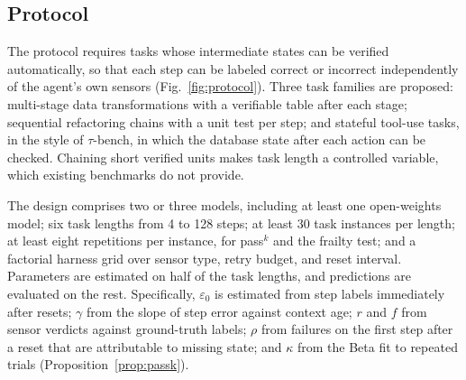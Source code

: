 \documentclass[journal]{IEEEtran}
\begin{document}
\subsection{Protocol}
The protocol requires tasks whose intermediate states can be verified automatically, so that each step can be labeled correct or incorrect independently of the agent's own sensors (Fig.~\ref{fig:protocol}). Three task families are proposed: multi-stage data transformations with a verifiable table after each stage; sequential refactoring chains with a unit test per step; and stateful tool-use tasks, in the style of $\tau$-bench, in which the database state after each action can be checked. Chaining short verified units makes task length a controlled variable, which existing benchmarks do not provide.

The design comprises two or three models, including at least one open-weights model; six task lengths from 4 to 128 steps; at least 30 task instances per length; at least eight repetitions per instance, for pass$^k$ and the frailty test; and a factorial harness grid over sensor type, retry budget, and reset interval. Parameters are estimated on half of the task lengths, and predictions are evaluated on the rest. Specifically, $\varepsilon_0$ is estimated from step labels immediately after resets; $\gamma$ from the slope of step error against context age; $r$ and $f$ from sensor verdicts against ground-truth labels; $\rho$ from failures on the first step after a reset that are attributable to missing state; and $\kappa$ from the Beta fit to repeated trials (Proposition~\ref{prop:passk}).
\end{document}
